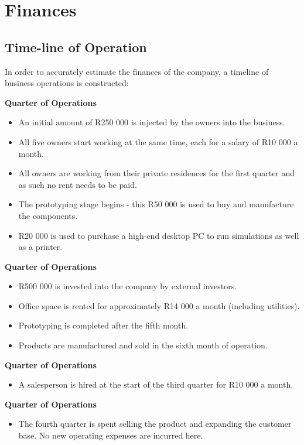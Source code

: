\newpage

\chapter{Finances}

\section{Time-line of Operation}
In order to accurately estimate the finances of the company, a timeline of business operations is constructed:

{\bfseries {} Quarter of Operations}
\begin{itemize}
\item An initial amount of R250 000 is injected by the owners into the business.
\item All five owners start working at the same time, each for a salary of R10 000 a month.
\item All owners are working from their private residences for the first quarter and as such no rent needs to be paid.
\item The prototyping stage begins - this R50 000 is used to buy and manufacture the components.
\item R20 000 is used to purchase a high-end desktop PC to run simulations as well as a printer.
\end{itemize}

{\bfseries {} Quarter of Operations}
\begin{itemize}
\item R500 000 is invested into the company by external investors.
\item Office space is rented for approximately R14 000 a month (including utilities).
\item Prototyping is completed after the fifth month.
\item Products are manufactured and sold in the sixth month of operation.
\end{itemize}

{\bfseries {} Quarter of Operations}
\begin{itemize}
\item A salesperson is hired at the start of the third quarter for R10 000 a month.
\end{itemize}

{\bfseries {} Quarter of Operations}
\begin{itemize}
\item The fourth quarter is spent selling the product and expanding the customer base. No new operating expenses are incurred here.
\end{itemize}

